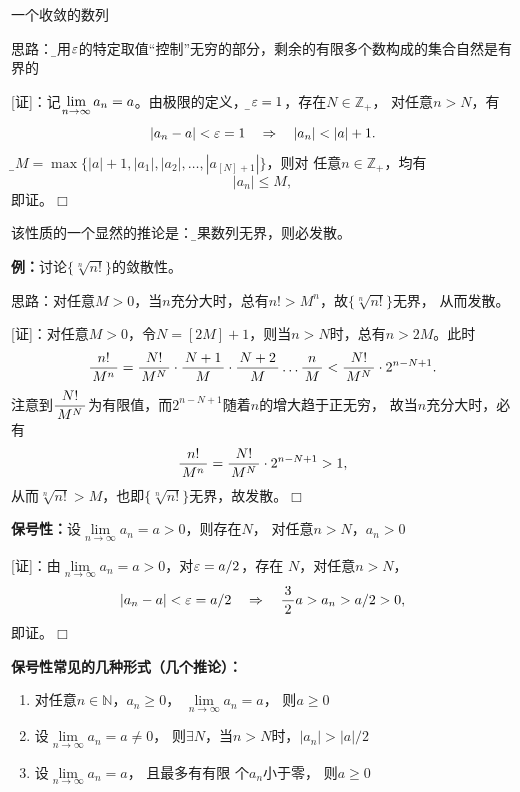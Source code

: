 \begin{center}
	
	一个收敛的数列
\end{center}

思路：{\b 利用$\varepsilon$的特定取值“控制”无穷的部分，剩余的有限多个数构成的集合自然是有界的}

[证]：记$\lim\limits_{n\to\infty} a_n=a$。由极限的定义，对{\b$\varepsilon=1$}，存在$N\in\mathbb{Z}_+$，
对任意$n>N$，有
$$|a_n-a|<\e=1\quad\Rightarrow\quad |a_n|<|a|+1.$$
记{\b$M=\max\{|a|+1,|a_1|,|a_2|,\ldots,|a_{[N]+1}|\}$}，则对
任意$n\in\mathbb{Z}_+$，均有
$$|a_n|\leq M,$$
即证。\hfill $\Box$

该性质的一个显然的推论是：{\b 如果数列无界，则必发散。}

{\bf 例：}讨论$\{\sqrt[n]{n!}\}$的敛散性。

思路：对任意$M>0$，当$n$充分大时，总有$n!>M^n$，故$\{\sqrt[n]{n!}\}$无界，
从而发散。

[证]：对任意$M>0$，令$N=[2M]+1$，则当$n>N$时，总有$n>2M$。此时
$$\displaystyle\frac{\,{n!}\,}{\,{M^n}\,}=\displaystyle\frac{\,{N!}\,}{\,{M^N}\,}\cdot\displaystyle\frac{\,{N+1}\,}{\,{M}\,}
\cdot\displaystyle\frac{\,{N+2}\,}{\,{M}\,}\ldots\displaystyle\frac{\,{n}\,}{\,{M}\,}<\displaystyle\frac{\,{N!}\,}{\,{M^N}\,}\cdot2^{n-N+1}.$$
注意到$\displaystyle\frac{\,{N!}\,}{\,{M^N}\,}$为有限值，而$2^{n-N+1}$随着$n$的增大趋于正无穷，
故当$n$充分大时，必有
$$\displaystyle\frac{\,{n!}\,}{\,{M^n}\,}=\displaystyle\frac{\,{N!}\,}{\,{M^N}\,}\cdot2^{n-N+1}>1,$$
从而$\sqrt[n]{n!}>M$，也即$\{\sqrt[n]{n!}\}$无界，故发散。\hfill $\Box$

{\bf 保号性：}设$\lim\limits_{n\to\infty}a_n=a>0$，则存在$N$，
对任意$n>N$，$a_n>0$

[证]：由$\lim\limits_{n\to\infty}a_n=a>0$，对$\varepsilon=a/2$，存在
$N$，对任意$n>N$，
$$|a_n-a|<\varepsilon=a/2\quad\Rightarrow\quad \displaystyle\frac{\,{3}\,}{\,{2}\,}a>a_n>a/2>0,$$
即证。\hfill $\Box$
		
{\bf 保号性常见的几种形式（几个推论）：}
\begin{enumerate}
  \setlength{\itemindent}{1cm}
  \item 对任意$n\in\mathbb{N}$，$a_n\geq
  0$， $\lim\limits_{n\to\infty}a_n=a$， 则$a\geq 0$
  \item 设$\lim\limits_{n\to\infty}a_n=a\ne
  0$， 则$\exists N$，当$n>N$时，$|a_n|>|a|/2$
  \item  设$\lim\limits_{n\to\infty}a_n=a$， 且最多有有限
  个$a_n$小于零， 则$a\geq 0$
\end{enumerate}	

